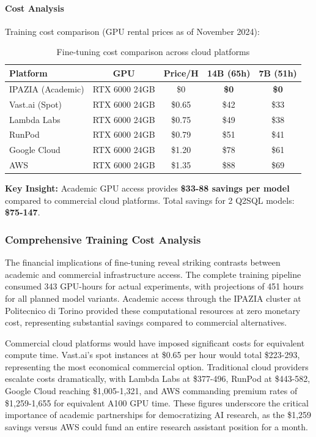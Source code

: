\paragraph{Cost Analysis}

Training cost comparison (GPU rental prices as of November 2024):

\begin{table}%
\centering
\small
\begin{tabular}{lcccc}
\toprule
\textbf{Platform} & \textbf{GPU} & \textbf{Price/H} & \textbf{14B (65h)} & \textbf{7B (51h)} \\
\midrule
IPAZIA (Academic) & RTX 6000 24GB & \$0 & \textbf{\$0} & \textbf{\$0} \\
Vast.ai (Spot) & RTX 6000 24GB & \$0.65 & \$42 & \$33 \\
Lambda Labs & RTX 6000 24GB & \$0.75 & \$49 & \$38 \\
RunPod & RTX 6000 24GB & \$0.79 & \$51 & \$41 \\
Google Cloud & RTX 6000 24GB & \$1.20 & \$78 & \$61 \\
AWS & RTX 6000 24GB & \$1.35 & \$88 & \$69 \\
\bottomrule
\end{tabular}
\caption{Fine-tuning cost comparison across cloud platforms}
\end{table}

\textbf{Key Insight:} Academic GPU access provides \textbf{\$33-88 savings per model} compared to commercial cloud platforms. Total savings for 2 Q2SQL models: \textbf{\$75-147}.

\subsubsection{Comprehensive Training Cost Analysis}

The financial implications of fine-tuning reveal striking contrasts between academic and commercial infrastructure access. The complete training pipeline consumed 343 GPU-hours for actual experiments, with projections of 451 hours for all planned model variants. Academic access through the IPAZIA cluster at Politecnico di Torino provided these computational resources at zero monetary cost, representing substantial savings compared to commercial alternatives.

Commercial cloud platforms would have imposed significant costs for equivalent compute time. Vast.ai's spot instances at \$0.65 per hour would total \$223-293, representing the most economical commercial option. Traditional cloud providers escalate costs dramatically, with Lambda Labs at \$377-496, RunPod at \$443-582, Google Cloud reaching \$1,005-1,321, and AWS commanding premium rates of \$1,259-1,655 for equivalent A100 GPU time. These figures underscore the critical importance of academic partnerships for democratizing AI research, as the \$1,259 savings versus AWS could fund an entire research assistant position for a month.

